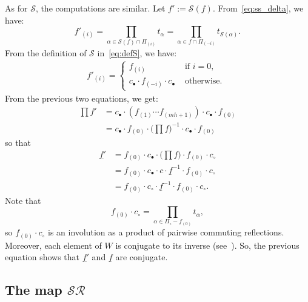 \documentclass[11pt]{article}
\theoremstyle{definition}
\newcommand{\RR}{\mathcal{R}}
\renewcommand{\SS}{\mathcal{S}}
\begin{document}
As for $\SS$, the computations are similar.  Let $f' := \SS(f)$.  From~\eqref{eq:ss_delta}, we have:
\[
    f'_{(i)} 
    =
    \prod_{ \alpha \in \SS(f) \cap \varPi_{(i)}} t_\alpha = \prod_{ \alpha \in f \cap \varPi_{(-i)}} t_{\SS(\alpha)}.
\]
From the definition of $\SS$ in~\eqref{eq:defS}, we have:
\begin{align} \label{eq:f'S}
    f'_{(i)} =
    \begin{cases}
        f_{(i)} & \text{ if } i=0, \\
        c_\bullet \cdot f_{(-i)} \cdot c_\bullet & \text{ otherwise. }
    \end{cases}
\end{align}
From the previous two equations, we get:
\begin{align}
    \textstyle\prod f' 
    &=
    c_\bullet \cdot (f_{(1)} \cdots f_{(mh+1)}) \cdot c_\bullet \cdot f_{(0)} \\
    &=
    c_\bullet \cdot f_{(0)} \cdot \big( \prod f \big)^{-1} \cdot c_\bullet \cdot f_{(0)}
\end{align}
so that
\begin{align}
    \underline{f'}
    &=
    f_{(0)} \cdot c_\bullet \cdot \big( \prod f \big) \cdot f_{(0)} \cdot c_\circ \\
    &=
    f_{(0)} \cdot c_\bullet \cdot  c \cdot \underline{f}^{-1} \cdot f_{(0)} \cdot c_\circ \\
    &= f_{(0)} \cdot c_\circ \cdot \underline{f}^{-1} \cdot f_{(0)} \cdot c_\circ.
\end{align}
Note that 
\[
    f_{(0)} \cdot c_\circ
    =
    \prod_{\alpha \in \Pi_\circ - f_{(0)}} t_\alpha,
\]
so $f_{(0)} \cdot c_\circ$ is an involution as a product of pairwise commuting reflections.  Moreover, each element of $W$ is conjugate to its inverse (see~\cite[Corollary~3.2.14]{geckpfeiffer}).  So, the previous equation shows that $\underline{f'}$ and $\underline{f}$ are conjugate.

\subsection{\texorpdfstring{The map $\SS\RR$}{The map SR}}
\end{document}
